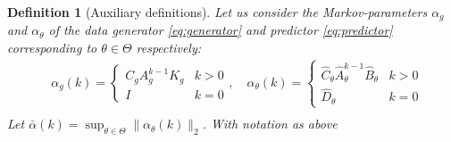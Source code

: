 \documentclass{article}
\def\rvy{{\mathbf{y}}}
\newtheorem{definition}[theorem]{Definition}
\newcommand{\Gp}{G_{\theta}}
\begin{document}
 \begin{definition}[Auxiliary definitions]
	\label{def:constants}
  Let us consider the Markov-parameters $\alpha_g$ and 
    $\alpha_{\theta}$ of the data generator \eqref{eq:generator} and predictor 
    \eqref{eq:predictor} corresponding to
    $\theta \in \Theta$ respectively:
    \begin{equation}
    \label{alpha:lemma:alpha_def}
    \begin{aligned}
    & \alpha_{g}(k)=\left\{\begin{array}{rl}
            C_g A_g^{k-1}K_g & k > 0 \\
            I & k = 0
    \end{array}\right., \quad   \alpha_{\theta}(k)=\left\{\begin{array}{rl}
            \widehat{C}_{\theta}\widehat{A}_{\theta}^{k-1}\widehat{B}_{\theta} & k > 0 \\
           \widehat{D}_{\theta}   & k = 0
    \end{array}\right. \\
\end{aligned}
\end{equation}
 Let $\bar{\alpha}(k)=\sup_{\theta \in \Theta} \|\alpha_{\theta}(k)\|_2$.
 With notation as above%
  \begin{align*}

\end{align*}
\end{definition}
\end{document}
